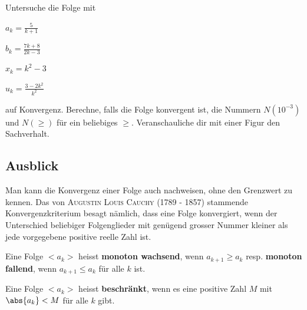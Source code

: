 \documentclass[%
11pt,%
twoside,%
titlepage,%
german,%
headsepline%
]{scrartcl}
\begin{document}
\begin{ueb}[Umgebung]
Untersuche die Folge mit

\begin{minipage}{0.3\textwidth}
\begin{enumeratea}
\item $a_k=\frac{5}{k+1}$
\item $b_k=\frac{7k+8}{2k-3}$
\end{enumeratea}
\end{minipage}
\begin{minipage}{0.4\textwidth}
\begin{enumeratea}
\setcounter{enumi}{2}
\item $x_k=k^2-3$
\item $u_k=\frac{3-2k^2}{k^2}$
\end{enumeratea}
\end{minipage}

auf Konvergenz. Berechne, falls die Folge konvergent ist, die Nummern $N(10^{-3})$ und $N(\ge)$ f\"ur ein beliebiges $\ge$. Veranschauliche dir mit einer Figur den Sachverhalt.
\end{ueb}

\subsection{Ausblick}
Man kann die Konvergenz einer Folge auch nachweisen, ohne den Grenzwert zu kennen. Das von \textsc{Augustin Louis Cauchy} (1789 - 1857) stammende Konvergenzkriterium besagt n\"amlich, dass eine Folge konvergiert, wenn der Unterschied beliebiger Folgenglieder mit gen\"ugend grosser Nummer kleiner als jede vorgegebene positive reelle Zahl ist.

\begin{cdef}[monoton]{}
Eine Folge $<a_k>$ heisst \textbf{monoton wachsend}, wenn $a_{k+1}\geq a_k$ resp. \textbf{monoton fallend}, wenn $a_{k+1}\leq a_k$ f\"ur alle $k$ ist.
\end{cdef}

\begin{cdef}[beschränkt]{}
Eine Folge $<a_k>$ heisst \textbf{beschr\"ankt}, wenn es eine positive Zahl $M$ mit $\abs{a_k}< M$ f\"ur alle $k$ gibt.
\end{cdef}

\clearpage
\end{document}
